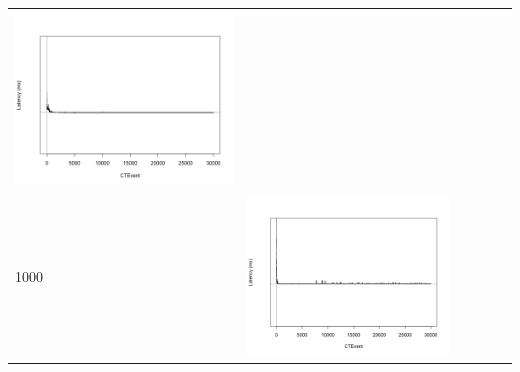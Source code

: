 \begin{table}[htbp]
{\begin{tabular}{l | ccccc}
\begin{minipage}{.15\textwidth}
     			 	\includegraphics[width=\linewidth]{images/lat-log-triple/I10}
    				 \end{minipage}\\	
		1000   &	 \begin{minipage}{.15\textwidth}\vspace{2pt}     							
     			 	\includegraphics[width=\linewidth]{images/lat-log-triple/I4}
    				 \end{minipage}
    			   &	 \begin{minipage}{.15\textwidth}\vspace{2pt}     							

\end{minipage}
\end{tabular}}
\end{table}
